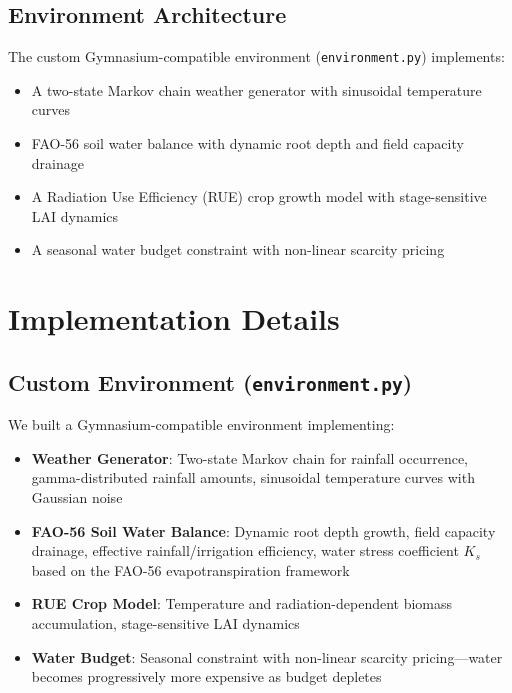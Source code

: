 \documentclass[12pt, a4paper]{article}
\begin{document}
\subsection{Environment Architecture}
The custom Gymnasium-compatible environment (\texttt{environment.py}) implements:
\begin{itemize}
    \item A two-state Markov chain weather generator with sinusoidal temperature curves
    \item FAO-56 soil water balance with dynamic root depth and field capacity drainage
    \item A Radiation Use Efficiency (RUE) crop growth model with stage-sensitive LAI dynamics
    \item A seasonal water budget constraint with non-linear scarcity pricing
\end{itemize}

\section{Implementation Details}

\subsection{Custom Environment (\texttt{environment.py})}
We built a Gymnasium-compatible environment implementing:
\begin{itemize}
    \item \textbf{Weather Generator}: Two-state Markov chain for rainfall occurrence, gamma-distributed rainfall amounts, sinusoidal temperature curves with Gaussian noise
    \item \textbf{FAO-56 Soil Water Balance}: Dynamic root depth growth, field capacity drainage, effective rainfall/irrigation efficiency, water stress coefficient $K_s$ based on the FAO-56 evapotranspiration framework \cite{fao56}
    \item \textbf{RUE Crop Model}: Temperature and radiation-dependent biomass accumulation, stage-sensitive LAI dynamics
    \item \textbf{Water Budget}: Seasonal constraint with non-linear scarcity pricing---water becomes progressively more expensive as budget depletes
\end{itemize}
\end{document}
